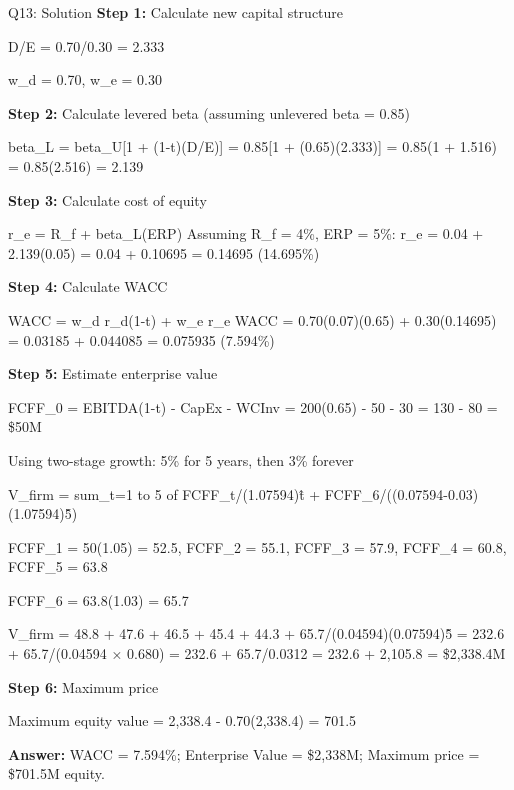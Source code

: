 \documentclass{beamer}
\renewcommand{\scriptsize}{\fontsize{6pt}{7pt}\selectfont}
\begin{document}
	\begin{frame}{Q13: Solution}
		\scriptsize
		\textbf{Step 1:} Calculate new capital structure
		
		D/E = 0.70/0.30 = 2.333
		
		w\_d = 0.70, w\_e = 0.30
		
		\vspace{2pt}
		\textbf{Step 2:} Calculate levered beta (assuming unlevered beta = 0.85)
		
		beta\_L = beta\_U[1 + (1-t)(D/E)] = 0.85[1 + (0.65)(2.333)] = 0.85(1 + 1.516) = 0.85(2.516) = 2.139
		
		\vspace{2pt}
		\textbf{Step 3:} Calculate cost of equity
		
		r\_e = R\_f + beta\_L(ERP)
		Assuming R\_f = 4\%, ERP = 5\%:
		r\_e = 0.04 + 2.139(0.05) = 0.04 + 0.10695 = 0.14695 (14.695\%)
		
		\vspace{2pt}
		\textbf{Step 4:} Calculate WACC
		
		WACC = w\_d r\_d(1-t) + w\_e r\_e
		WACC = 0.70(0.07)(0.65) + 0.30(0.14695) = 0.03185 + 0.044085 = 0.075935 (7.594\%)
		
		\vspace{2pt}
		\textbf{Step 5:} Estimate enterprise value
		
		FCFF\_0 = EBITDA(1-t) - CapEx - WCInv = 200(0.65) - 50 - 30 = 130 - 80 = \$50M
		
		Using two-stage growth: 5\% for 5 years, then 3\% forever
		
		V\_firm = sum\_t=1 to 5 of FCFF\_t/(1.07594)\^t + FCFF\_6/((0.07594-0.03)(1.07594)\^5)
		
		FCFF\_1 = 50(1.05) = 52.5, FCFF\_2 = 55.1, FCFF\_3 = 57.9, FCFF\_4 = 60.8, FCFF\_5 = 63.8
		
		FCFF\_6 = 63.8(1.03) = 65.7
		
		V\_firm = 48.8 + 47.6 + 46.5 + 45.4 + 44.3 + 65.7/(0.04594)(0.07594)\^5
		= 232.6 + 65.7/(0.04594 × 0.680)
		= 232.6 + 65.7/0.0312 = 232.6 + 2,105.8 = \$2,338.4M
		
		\vspace{2pt}
		\textbf{Step 6:} Maximum price
		
		Maximum equity value = 2,338.4 - 0.70(2,338.4) = 701.5
		
		\textbf{Answer:} WACC = 7.594\%; Enterprise Value = \$2,338M; Maximum price = \$701.5M equity.
	\end{frame}
	
\end{document}
